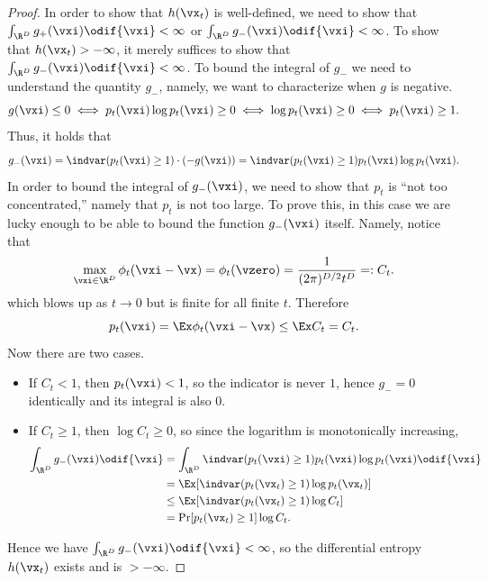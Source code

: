 \documentclass[../../book-main.tex]{subfiles}
\begin{document}
\begin{proof}
    In order to show that \(h(\vx_{t})\) is well-defined, we need to
    show that \(\int_{\R^{D}}g_{+}(\vxi)\odif{\vxi} < \infty\) or
    \(\int_{\R^{D}}g_{-}(\vxi) \odif{\vxi} < \infty\). To show that
    \(h(\vx_{t}) > -\infty\), it merely suffices to show that
    \(\int_{\R^{D}}g_{-}(\vxi)\odif{\vxi} < \infty\). To bound the
    integral of \(g_{-}\) we need to understand the quantity
    \(g_{-}\), namely, we want to characterize when \(g\) is negative.
    \begin{equation}
        g(\vxi) \leq 0 \iff p_{t}(\vxi)\log p_{t}(\vxi) \geq 0 \iff
        \log p_{t}(\vxi) \geq 0 \iff p_{t}(\vxi) \geq 1.
    \end{equation}
    Thus, it holds that
    \begin{equation}
        g_{-}(\vxi) = \indvar(p_{t}(\vxi) \geq 1)\cdot (-g(\vxi)) =
        \indvar(p_{t}(\vxi) \geq 1)p_{t}(\vxi)\log p_{t}(\vxi).
    \end{equation}
    In order to bound the integral of \(g_{-}(\vxi)\), we need to
    show that \(p_{t}\) is ``not too concentrated,'' namely that
    \(p_{t}\) is not too large. To prove this, in this case we are
    lucky enough to be able to bound the function \(g_{-}(\vxi)\)
    itself. Namely, notice that
    \begin{equation}
        \max_{\vxi \in \R^{D}}\phi_{t}(\vxi - \vx) = \phi_{t}(\vzero)
        = \frac{1}{(2\pi)^{D/2}t^{D}} =: C_{t}.
    \end{equation}
    which blows up as \(t \to 0\) but is finite for all finite \(t\). Therefore
    \begin{equation}
        p_{t}(\vxi) = \Ex \phi_{t}(\vxi - \vx) \leq \Ex C_{t} = C_{t}.
    \end{equation}
    Now there are two cases.
    \begin{itemize}
        \item If \(C_{t} < 1\), then \(p_{t}(\vxi) < 1\), so the
            indicator is never \(1\), hence \(g_{-} = 0\) identically
            and its integral is also \(0\).
        \item If \(C_{t} \geq 1\), then \(\log C_{t} \geq 0\), so
            since the logarithm is monotonically increasing,
            \begin{align}
                \int_{\R^{D}}g_{-}(\vxi)\odif{\vxi}
                &= \int_{\R^{D}}\indvar(p_{t}(\vxi) \geq
                1)p_{t}(\vxi)\log p_{t}(\vxi)\odif{\vxi}  \\
                &= \Ex[\indvar(p_{t}(\vx_{t}) \geq 1)\log p_{t}(\vx_{t})]  \\
                &\leq \Ex[\indvar(p_{t}(\vx_{t}) \geq 1) \log C_{t}] \\
                &= \Pr[p_{t}(\vx_{t}) \geq 1]\log C_{t}.
            \end{align}
    \end{itemize}
    Hence we have \(\int_{\R^{D}}g_{-}(\vxi)\odif{\vxi} < \infty\),
    so the differential entropy \(h(\vx_{t})\) exists and is \(> -\infty\).


\end{proof}
\end{document}
